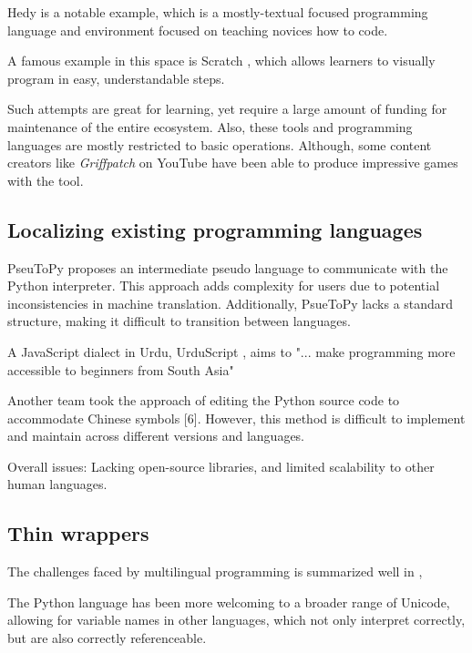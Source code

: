 \documentclass[conference]{IEEEtran}
\begin{document}
Hedy \cite{Hermans_Hedy_A_Gradual} is a notable example, which is a mostly-textual focused programming language and environment focused on teaching novices how to code.

A famous example in this space is Scratch \cite{resnick2009scratch}, which allows learners to visually program in easy, understandable steps.

Such attempts are great for learning, yet require a large amount of funding for maintenance of the entire ecosystem. Also, these tools and programming languages are mostly restricted to basic operations. Although, some content creators like \textit{Griffpatch} on YouTube \cite{freitasfilho2022scratch} have been able to produce impressive games with the tool.

\subsection{Localizing existing programming languages}

PseuToPy \cite{wang2021pseutopy} proposes an intermediate pseudo language to communicate with the Python interpreter. This approach adds complexity for users due to potential inconsistencies in machine translation. Additionally, PsueToPy lacks a standard structure, making it difficult to transition between languages. 

A JavaScript dialect in Urdu, UrduScript \cite{Memon_UrduScript_2019}, aims to "... make programming more accessible to beginners from South Asia" \cite{Urdu_Mein_Programming}

Another team took the approach of editing the Python source code to accommodate Chinese symbols [6]. However, this method is difficult to implement and maintain across different versions and languages.

Overall issues: Lacking open-source libraries, and limited scalability to other human languages.

\subsection{Thin wrappers}

The challenges faced by multilingual programming is summarized well in \cite{swidan2023framework}, 

The Python language has been more welcoming to a broader range of Unicode, allowing for variable names in other languages, which not only interpret correctly, but are also correctly referenceable. \cite{coghlan2014transition}
\end{document}
